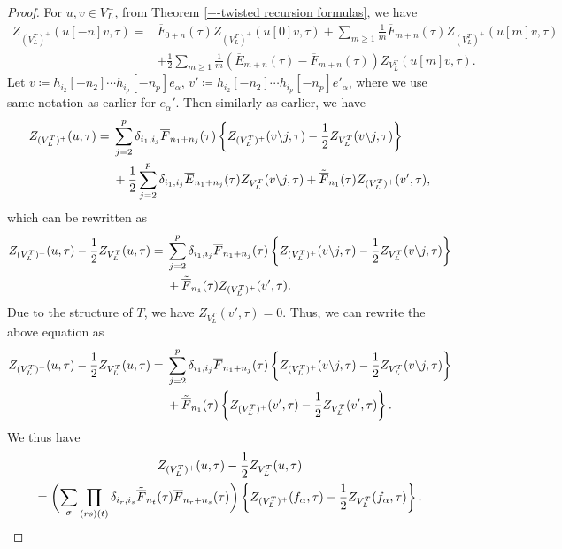 \documentclass[pdftex]{sigma}
\numberwithin{equation}{section}
\theoremstyle{definition}
\begin{document}
\begin{proof}

For $u,v\in V_L^-$, from Theorem \ref{+-twisted recursion formulas}, we have
 \begin{align*}
 Z_{(V_L^T)^+}(u[-n]v,\tau)={}&\overline{F}_{0+n}(\tau)Z_{(V_L^T)^+}(u[0]v,\tau)+\sum_{m\geq 1}\frac{1}{m}\overline{F}_{m+n}(\tau)Z_{(V_L^T)^+}(u[m]v,\tau)\\
 &+\frac{1}{2}\sum_{m\geq 1}\frac{1}{m}\left(\overline{E}_{m+n}(\tau)-\overline{F}_{m+n}(\tau)\right)Z_{V_L^T}(u[m]v, \tau).
 \end{align*}
Let
$v\coloneqq h_{i_2}[-n_2]\cdots h_{i_p}[-n_p]e_{\alpha}$,
$v'\coloneqq h_{i_2}[-n_2]\cdots h_{i_p}[-n_p]e'_{\alpha}$,
where we use same notation as earlier for $e_{\alpha}'$. Then similarly as earlier, we have
 \begin{align*}
 Z_{(V_L^T)^+}(u,\tau)={}&\sum_{j=2}^p\delta_{i_1,i_j}\overline{F}_{n_1+n_j}(\tau)\left\{Z_{(V_L^T)^+}(v\backslash j,\tau)-\frac{1}{2}Z_{V_L^T}(v\backslash j,\tau)\right\}\\
&+\frac{1}{2}\sum_{j=2}^p\delta_{i_1,i_j}\overline{E}_{n_1+n_j}(\tau)Z_{V_L^T}(v\backslash j,\tau)+\Tilde{\overline{F}}_{n_1}(\tau)Z_{(V_L^T)^+}(v',\tau),
\end{align*}
which can be rewritten as
 \begin{align*}
 Z_{(V_L^T)^+}(u,\tau)-\frac{1}{2}Z_{V_L^T}(u,\tau)={}&\sum_{j=2}^p\delta_{i_1,i_j}\overline{F}_{n_1+n_j}(\tau)\left\{Z_{(V_L^T)^+}(v\backslash j,\tau)-\frac{1}{2}Z_{V_L^T}(v\backslash j,\tau)\right\}\\
&+\Tilde{\overline{F}}_{n_1}(\tau)Z_{(V_L^T)^+}(v',\tau).
\end{align*}
Due to the structure of $T$, we have
$Z_{V_L^T}(v',\tau)=0$.
Thus, we can rewrite the above equation as
 \begin{align*}
 Z_{(V_L^T)^+}(u,\tau)-\frac{1}{2}Z_{V_L^T}(u,\tau)={}&\sum_{j=2}^p\delta_{i_1,i_j}\overline{F}_{n_1+n_j}(\tau)\left\{Z_{(V_L^T)^+}(v\backslash j,\tau)-\frac{1}{2}Z_{V_L^T}(v\backslash j,\tau)\right\}\\
&+\Tilde{\overline{F}}_{n_1}(\tau)\left\{Z_{(V_L^T)^+}(v',\tau)-\frac{1}{2}Z_{V_L^T}(v',\tau)\right\}.
\end{align*}
We thus have
\begin{gather*}
Z_{(V_L^T)^+}(u,\tau)-\frac{1}{2}Z_{V_L^T}(u,\tau)\\
\qquad=\biggl(\sum_{\sigma}\prod_{(rs)(t)}\delta_{i_r,i_s}\Tilde{\overline{F}}_{n_t}
(\tau)\overline{F}_{n_r+n_s}(\tau)\biggr)\left\{Z_{(V_L^T)^+}(f_{\alpha},\tau)
-\frac{1}{2}Z_{V_L^T}(f_{\alpha},\tau)\right\}.\tag*{\qed}
\end{gather*}\renewcommand{\qed}{}
\end{proof}
\end{document}

